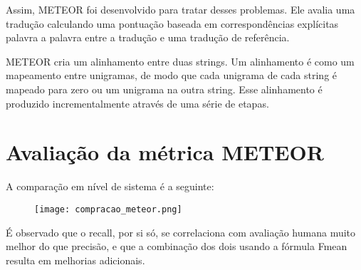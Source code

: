 \documentclass[12pt]{article}
\begin{document}
Assim, METEOR foi desenvolvido para tratar desses problemas. Ele avalia uma tradução calculando uma pontuação baseada em correspondências explícitas palavra a palavra entre a tradução e uma tradução de referência.

METEOR cria um alinhamento entre duas strings. Um alinhamento é como um mapeamento entre unigramas, de modo que cada unigrama de cada string é mapeado para zero ou um unigrama na outra string. Esse alinhamento é produzido incrementalmente através de uma série de etapas.

\section*{Avaliação da métrica METEOR}

A comparação em nível de sistema é a seguinte:

\begin{figure}[H]
    \centering
    \texttt{[image: compracao\_meteor.png]}
    \label{fig:enter-label}
\end{figure}

É observado que o recall, por si só, se correlaciona com avaliação humana muito melhor do que precisão, e que a combinação dos dois usando a fórmula Fmean resulta em melhorias adicionais.
\end{document}
